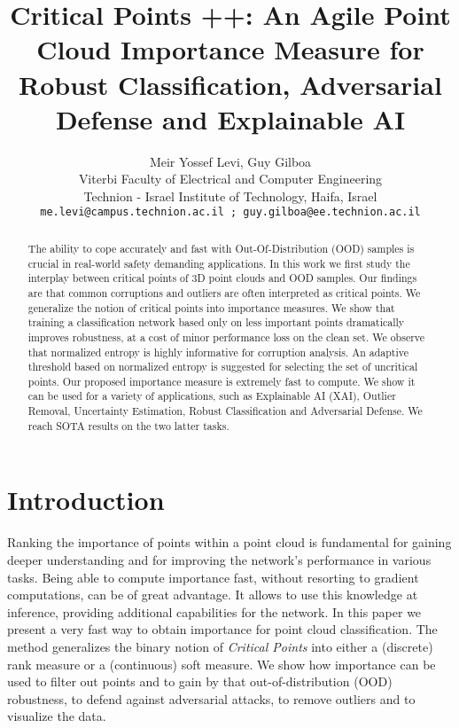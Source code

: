 \documentclass[10pt,twocolumn,letterpaper]{article}
\title{Critical Points ++: An Agile Point Cloud Importance Measure for Robust Classification, Adversarial Defense and Explainable AI}
\author{Meir Yossef Levi, Guy Gilboa\\
Viterbi Faculty of Electrical and Computer Engineering \\
Technion - Israel Institute of Technology, Haifa, Israel\\
{\tt\small me.levi@campus.technion.ac.il ; guy.gilboa@ee.technion.ac.il}
}
\begin{document}
\maketitle
\begin{abstract}
The ability to cope accurately and fast with 
Out-Of-Distribution (OOD) samples is crucial
in real-world safety demanding applications. 
In this work we first study
the interplay between critical points of 3D point clouds and OOD samples. Our findings are that common corruptions and outliers are often interpreted as critical points.
We generalize the notion of critical points into importance measures. We  show that training a classification network based only on 
less important points  dramatically improves robustness, at a cost of minor performance loss on the clean set.
We observe that normalized entropy is highly informative for corruption analysis. An adaptive threshold based on normalized entropy is suggested for selecting the set of uncritical points. Our proposed importance measure is extremely fast to compute.  We show it can be used for
a variety of applications, such as Explainable AI (XAI), Outlier Removal, Uncertainty Estimation, Robust Classification and Adversarial Defense. We reach SOTA results on the two latter tasks. 
\end{abstract}

\section{Introduction}
Ranking the importance of points within a point cloud is fundamental for gaining deeper understanding and for improving the network's performance in various tasks. Being able to compute importance fast, without resorting to gradient computations, can be of great advantage. It allows to use this knowledge at inference, providing additional capabilities for the network. 
In this paper we present a very fast way to obtain importance for point cloud classification. The method generalizes the binary notion of
\textit{Critical Points}\cite{pointnet} into either a (discrete) rank measure or a (continuous) soft measure. We show how  importance  can be used to filter out points and to gain by that out-of-distribution (OOD) robustness, to defend against adversarial attacks, to remove outliers and to visualize the data.
\end{document}
